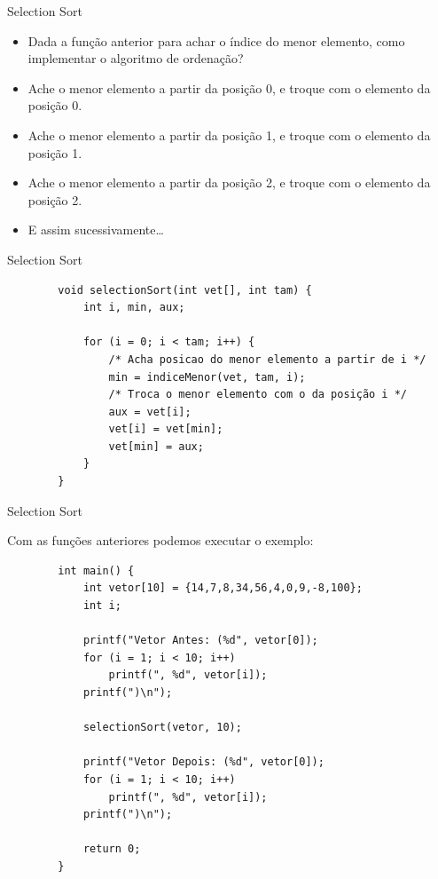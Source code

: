 \documentclass[handout]{beamer}
\begin{document}
\begin{frame}[fragile]{Selection Sort}

    \begin{itemize}
        \item Dada a função anterior para achar o índice do menor elemento, como implementar o algoritmo de ordenação?
        \item Ache o menor elemento a partir da posição 0, e troque com o elemento da posição 0.
        \item Ache o menor elemento a partir da posição 1, e troque com o elemento da posição 1.
        \item Ache o menor elemento a partir da posição 2, e troque com o elemento da posição 2.
        \item E assim sucessivamente\ldots
    \end{itemize}

\end{frame}

\begin{frame}[fragile]{Selection Sort}

    \begin{verbatim}
        void selectionSort(int vet[], int tam) {
            int i, min, aux;
            
            for (i = 0; i < tam; i++) {
                /* Acha posicao do menor elemento a partir de i */
                min = indiceMenor(vet, tam, i);
                /* Troca o menor elemento com o da posição i */
                aux = vet[i];
                vet[i] = vet[min];
                vet[min] = aux;
            }
        }
    \end{verbatim}

\end{frame}

\begin{frame}[fragile]{Selection Sort}

    Com as funções anteriores podemos executar o exemplo:
    \vspace{-1em}
    \begin{verbatim}
        int main() {
            int vetor[10] = {14,7,8,34,56,4,0,9,-8,100};
            int i;

            printf("Vetor Antes: (%d", vetor[0]);
            for (i = 1; i < 10; i++)
                printf(", %d", vetor[i]);
            printf(")\n");

            selectionSort(vetor, 10);

            printf("Vetor Depois: (%d", vetor[0]);
            for (i = 1; i < 10; i++)
                printf(", %d", vetor[i]);
            printf(")\n");

            return 0;
        }
    \end{verbatim}

\end{frame}
\end{document}

